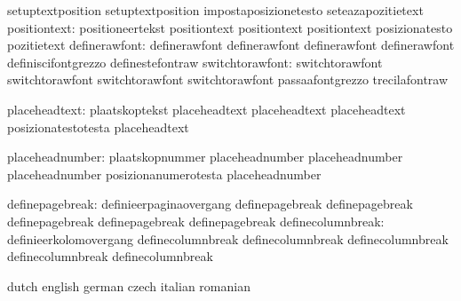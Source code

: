                                   setuptextposition                setuptextposition
                                  impostaposizionetesto            seteazapozitietext
                    positiontext: positioneertekst                 positiontext
                                  positiontext                     positiontext
                                  posizionatesto                   pozitietext %
                   definerawfont: definerawfont                    definerawfont
                                  definerawfont                    definerawfont
                                  definiscifontgrezzo              definestefontraw
                 switchtorawfont: switchtorawfont                  switchtorawfont
                                  switchtorawfont                  switchtorawfont
                                  passaafontgrezzo                 trecilafontraw

  placeheadtext: plaatskoptekst           placeheadtext
                 placeheadtext            placeheadtext
                 posizionatestotesta      placeheadtext

placeheadnumber: plaatskopnummer          placeheadnumber
                 placeheadnumber          placeheadnumber
                 posizionanumerotesta     placeheadnumber

  definepagebreak: definieerpaginaovergang  definepagebreak
                   definepagebreak          definepagebreak
                   definepagebreak          definepagebreak
definecolumnbreak: definieerkolomovergang  definecolumnbreak
                   definecolumnbreak       definecolumnbreak
                   definecolumnbreak       definecolumnbreak

\stopcommands





\startcommands                    dutch                            english
                                  german                           czech
                                  italian                          romanian


